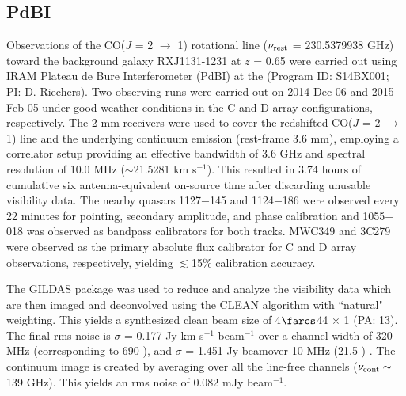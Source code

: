 \documentclass[]{emulateapj}
\begin{document}
\subsection{PdBI} \label{sec:PdBIdata}
Observations of the CO($J$ = 2 $\rightarrow$ 1) rotational line ($\nu_{\rm
rest}$ = 230.5379938 GHz) toward the background galaxy RXJ1131-1231 at $z$ =
0.65
 were carried out using IRAM Plateau de Bure Interferometer (PdBI) at the
(Program ID: S14BX001; PI: D. Riechers).
 Two observing runs were carried out on 2014 Dec 06 and 2015 Feb 05 under good
weather conditions in the C and D array configurations, respectively. The 2 mm
receivers were used to cover the redshifted CO($J$ = 2 $\rightarrow$ 1) line
and the
underlying continuum emission (rest-frame 3.6 mm), employing
a correlator setup providing an effective bandwidth of 3.6 GHz and spectral
resolution of 10.0 MHz ($\sim$21.5281 km s$^{-1}$).
This resulted in 3.74 hours of cumulative six antenna-equivalent on-source time
after discarding unusable visibility data.
The nearby quasars 1127$-$145 and 1124$-$186 were observed every 22 minutes
for
pointing, secondary amplitude, and phase calibration and 1055$+$018 was
observed as bandpass calibrators for both tracks.
MWC349 and 3C279 were observed as the primary
absolute flux calibrator for C and D array observations, respectively, yielding
$\lesssim$15\% calibration accuracy.

The GILDAS package was used to reduce and analyze the visibility data which are
then imaged and deconvolved using the CLEAN algorithm with ``natural" weighting. 
This yields a synthesized clean
beam size of 4$\farcs$44 $\times$ 1 (PA: 13\degr). The final rms noise
is $\sigma$ = 0.177 Jy km s$^{-1}$ beam$^{-1}$ over a channel width of 320 MHz (corresponding to
690 \kms), and $\sigma$ = 1.451 Jy \kms beam\pmOne over 10 MHz
(21.5 \kms) .
The continuum image is created by %
averaging over all the line-free channels ($\nu_{\rm cont}\sim$139 GHz). This
yields an rms noise of 0.082 mJy beam$^{-1}$. %
\end{document}
